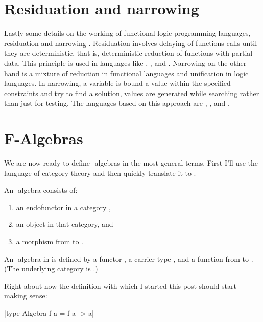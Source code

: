 \documentclass[proposal.tex]{subfiles}
\begin{document}
\section{Residuation and narrowing}
Lastly some details on the working of functional logic programming languages, residuation and narrowing
\cite{hanus1995curry,webiste:wikicurry}.
Residuation involves delaying of functions calls until they are deterministic, that is, deterministic reduction of
functions with partial data.
This principle is used in languages like  \cite{lloyd1999programming:escher}, 
\cite{website:life},  \cite{website:nue-prolog} and  \cite{website:oz-mozart}.
Narrowing on the other hand is a mixture of reduction in functional languages and unification in logic languages.
In narrowing, a variable is bound a value within the specified constraints and try to find a solution, values are
generated while searching rather than just for testing.
The languages based on this approach are  \cite{website:alf},  \cite{website:babel},
 \cite{bert1987lpg} and  \cite{website:curry}.


\section{F-Algebras}


We are now ready to define -algebras in the most general terms.
First I'll use the language of category theory and then quickly translate it to .

An -algebra consists of:
\begin{enumerate}
\item an endofunctor  in a category ,
\item an object  in that category, and
\item a morphism from  to .
\end{enumerate}

An -algebra in  is defined by a functor , a carrier type , and a function from  to . (The underlying category is .)

Right about now the definition with which I started this post should start making sense:

|type Algebra f a = f a -> a|
\end{document}
